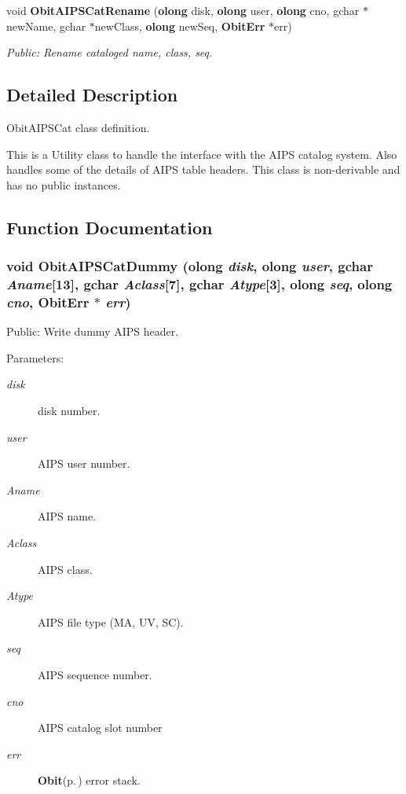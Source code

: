\begin{CompactItemize}
void {\bf Obit\-AIPSCat\-Rename} ({\bf olong} disk, {\bf olong} user, {\bf olong} cno, gchar $\ast$new\-Name, gchar $\ast$new\-Class, {\bf olong} new\-Seq, {\bf Obit\-Err} $\ast$err)
\begin{CompactList}\small\item\em Public: Rename cataloged name, class, seq. \item\end{CompactList}\end{CompactItemize}


\subsection{Detailed Description}
Obit\-AIPSCat class definition. 

This is a Utility class to handle the interface with the AIPS catalog system. Also handles some of the details of AIPS table headers. This class is non-derivable and has no public instances.

\subsection{Function Documentation}
\subsubsection{\setlength{\rightskip}{0pt plus 5cm}void Obit\-AIPSCat\-Dummy ({\bf olong} {\em disk}, {\bf olong} {\em user}, gchar {\em Aname}[13], gchar {\em Aclass}[7], gchar {\em Atype}[3], {\bf olong} {\em seq}, {\bf olong} {\em cno}, {\bf Obit\-Err} $\ast$ {\em err})}\label{ObitAIPSCat_8h_a10}


Public: Write dummy AIPS header. 

\begin{Desc}
\item[Parameters:]
\begin{description}
\item[{\em disk}]disk number. \item[{\em user}]AIPS user number. \item[{\em Aname}]AIPS name. \item[{\em Aclass}]AIPS class. \item[{\em Atype}]AIPS file type (MA, UV, SC). \item[{\em seq}]AIPS sequence number. \item[{\em cno}]AIPS catalog slot number \item[{\em err}]{\bf Obit}{\rm (p.\,\pageref{structObit})} error stack. \end{description}
\end{Desc}
